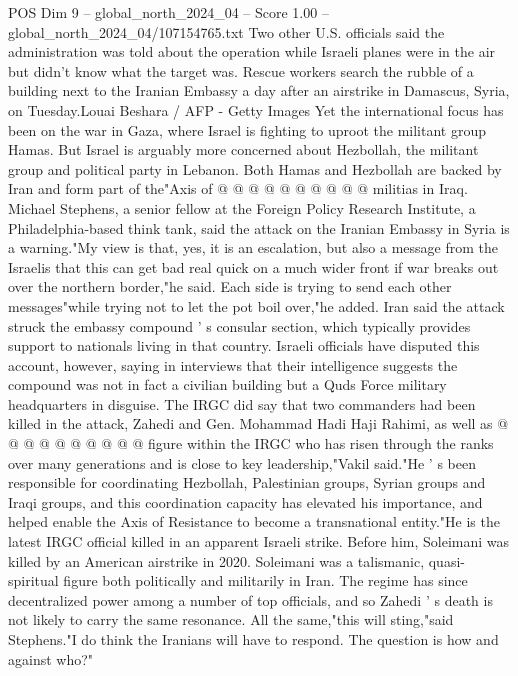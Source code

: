 \begin{textsample}{POS Dim 9 – global\_north\_2024\_04 – Score 1.00 – global\_north\_2024\_04/107154765.txt}
Two other U.S. officials said the administration was told about the operation while Israeli planes were in the air but didn't know what the target was.
Rescue workers search the rubble of a building next to the Iranian Embassy a day after an airstrike in Damascus, Syria, on Tuesday.Louai Beshara / AFP - Getty Images Yet the international focus has been on the war in Gaza, where Israel is fighting to uproot the militant group Hamas.
But Israel is arguably more concerned about Hezbollah, the militant group and political party in Lebanon.
Both Hamas and Hezbollah are backed by Iran and form part of the"Axis of @ @ @ @ @ @ @ @ @ @ militias in Iraq.
Michael Stephens, a senior fellow at the Foreign Policy Research Institute, a Philadelphia-based think tank, said the attack on the Iranian Embassy in Syria is a warning."My view is that, yes, it is an escalation, but also a message from the Israelis that this can get bad real quick on a much wider front if war breaks out over the northern border,"he said.
Each side is trying to send each other messages"while trying not to let the pot boil over,"he added.
Iran said the attack struck the embassy compound ' s consular section, which typically provides support to nationals living in that country.
Israeli officials have disputed this account, however, saying in interviews that their intelligence suggests the compound was not in fact a civilian building but a Quds Force military headquarters in disguise.
The IRGC did say that two commanders had been killed in the attack, Zahedi and Gen.
Mohammad Hadi Haji Rahimi, as well as @ @ @ @ @ @ @ @ @ @ figure within the IRGC who has risen through the ranks over many generations and is close to key leadership,"Vakil said."He ' s been responsible for coordinating Hezbollah, Palestinian groups, Syrian groups and Iraqi groups, and this coordination capacity has elevated his importance, and helped enable the Axis of Resistance to become a transnational entity."He is the latest IRGC official killed in an apparent Israeli strike.
Before him, Soleimani was killed by an American airstrike in 2020.
Soleimani was a talismanic, quasi-spiritual figure both politically and militarily in Iran.
The regime has since decentralized power among a number of top officials, and so Zahedi ' s death is not likely to carry the same resonance.
All the same,"this will sting,"said Stephens."I do think the Iranians will have to respond.
The question is how and against who?"

\end{textsample}
